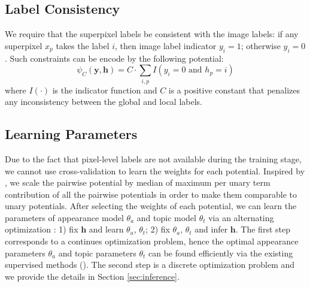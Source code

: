 \subsection{Label Consistency}
We require that the superpixel labels be consistent with the image labels: if any superpixel $x_p$ takes the label $i$, then image label indicator $y_i=1$; otherwise $y_i=0$. Such constraints can be encode by the following potential:
\begin{equation}
    \psi_{C}(\boldsymbol{y},\boldsymbol{h}) =
    C \cdot \sum_{i,p} I(y_i=0 \mbox{ and } h_p=i)
\end{equation}
where $I(\cdot)$ is the indicator function and $C$ is a positive constant that penalizes any inconsistency between the global and local labels.

\subsection{Learning Parameters}
Due to the fact that pixel-level labels are not available during the training stage, we cannot use cross-validation \cite{kohli2009robust} to learn the weights for each potential. Inspired by \cite{vezhnevets2011weakly}, we scale the pairwise potential by median of maximum per unary term contribution of all the pairwise potentials in order to make them comparable to unary potentials. After selecting the weights of each potential, we can learn the parameters of appearance model $\theta_a$ and topic model $\theta_t$ via an alternating optimization \cite{vezhnevets2011weakly}: 1) fix $\boldsymbol{h}$ and learn $\theta_a$, $\theta_t$; 2) fix $\theta_a$, $\theta_t$ and infer $\boldsymbol{h}$. The first step corresponds to a continues optimization problem, hence the optimal appearance parameters $\theta_a$ and topic parameters $\theta_t$ can be found efficiently via the existing supervised methods (\eg \cite{shotton2006textonboost}). The second step is a discrete optimization problem and we provide the details in Section \ref{sec:inference}.

